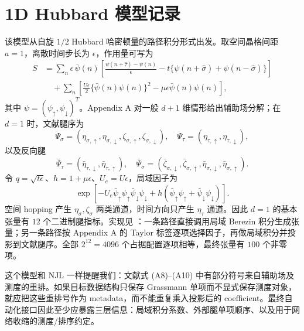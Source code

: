 \documentclass[UTF8,11pt]{ctexart}
\begin{document}
\section{1D Hubbard 模型记录}
该模型从自旋 $1/2$ Hubbard 哈密顿量的路径积分形式出发。取空间晶格间距 $a=1$，离散时间步长为 $\epsilon$，作用量可写为
\begin{align}
 S&=\sum_n\epsilon\,\bar\psi(n)
 \left[\frac{\psi(n+\hat\tau)-\psi(n)}{\epsilon}
 -t\{\psi(n+\hat\sigma)+\psi(n-\hat\sigma)\}\right]\\
 &\quad +\sum_n\left[\frac{U\epsilon}{2}\{\bar\psi(n)\psi(n)\}^2
 -\mu\epsilon\bar\psi(n)\psi(n)\right],
\end{align}
其中 $\psi=(\psi_\uparrow,\psi_\downarrow)^T$。Appendix A 对一般 $d+1$ 维情形给出辅助场分解；在 $d=1$ 时，文献腿序为
\begin{equation}
 \Psi_\sigma=(\eta_{\sigma,\uparrow},\eta_{\sigma,\downarrow},
 \zeta_{\sigma,\uparrow},\zeta_{\sigma,\downarrow}),\quad
 \Psi_\tau=(\eta_{\tau,\uparrow},\eta_{\tau,\downarrow}),
\end{equation}
以及反向腿
\begin{equation}
 \bar\Psi_\tau=(\bar\eta_{\tau,\downarrow},\bar\eta_{\tau,\uparrow}),\quad
 \bar\Psi_\sigma=(\bar\zeta_{\sigma,\downarrow},\bar\zeta_{\sigma,\uparrow},
 \bar\eta_{\sigma,\downarrow},\bar\eta_{\sigma,\uparrow}).
\end{equation}
令 $q=\sqrt{t\epsilon}$、$h=1+\mu\epsilon$、$U_e=U\epsilon$，局域因子为
\begin{equation}
 \exp[-U_e\bar\psi_\uparrow\psi_\uparrow\bar\psi_\downarrow\psi_\downarrow
 +h(\bar\psi_\uparrow\psi_\uparrow+
 \bar\psi_\downarrow\psi_\downarrow)].
\end{equation}
空间 hopping 产生 $\eta_\sigma,\zeta_\sigma$ 两类通道，时间方向只产生 $\eta_\tau$ 通道。因此 $d=1$ 的基本张量有 $12$ 个二进制腿指标。实现见 ：一条路径直接调用局域 Berezin 积分生成张量；另一条路径按 Appendix A 的 Taylor 标签逐项选择因子，再做局域积分并投影到文献腿序。全部 $2^{12}=4096$ 个占据配置逐项相等，最终张量有 $100$ 个非零项。

这个模型和 NJL 一样提醒我们：文献式 (A8)--(A10) 中有部分符号来自辅助场及测度的重排。如果目标数据结构只保存 Grassmann 单项而不显式保存测度对象，就应把这些重排号作为 metadata，而不能重复乘入投影后的 coefficient。最终自动化接口因此至少应暴露三层信息：局域积分系数、外部腿单项顺序、以及用于网络收缩的测度/排序约定。
\end{document}
